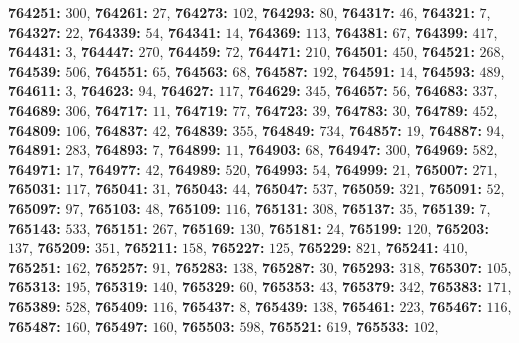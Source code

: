 \textsf{\bfseries 764251:} $300$, \textsf{\bfseries 764261:} $27$, \textsf{\bfseries 764273:} $102$, \textsf{\bfseries 764293:} $80$, \textsf{\bfseries 764317:} $46$, \textsf{\bfseries 764321:} $7$, \textsf{\bfseries 764327:} $22$, \textsf{\bfseries 764339:} $54$, \textsf{\bfseries 764341:} $14$, \textsf{\bfseries 764369:} $113$, \textsf{\bfseries 764381:} $67$, \textsf{\bfseries 764399:} $417$, \textsf{\bfseries 764431:} $3$, \textsf{\bfseries 764447:} $270$, \textsf{\bfseries 764459:} $72$, \textsf{\bfseries 764471:} $210$, \textsf{\bfseries 764501:} $450$, \textsf{\bfseries 764521:} $268$, \textsf{\bfseries 764539:} $506$, \textsf{\bfseries 764551:} $65$, \textsf{\bfseries 764563:} $68$, \textsf{\bfseries 764587:} $192$, \textsf{\bfseries 764591:} $14$, \textsf{\bfseries 764593:} $489$, \textsf{\bfseries 764611:} $3$, \textsf{\bfseries 764623:} $94$, \textsf{\bfseries 764627:} $117$, \textsf{\bfseries 764629:} $345$, \textsf{\bfseries 764657:} $56$, \textsf{\bfseries 764683:} $337$, \textsf{\bfseries 764689:} $306$, \textsf{\bfseries 764717:} $11$, \textsf{\bfseries 764719:} $77$, \textsf{\bfseries 764723:} $39$, \textsf{\bfseries 764783:} $30$, \textsf{\bfseries 764789:} $452$, \textsf{\bfseries 764809:} $106$, \textsf{\bfseries 764837:} $42$, \textsf{\bfseries 764839:} $355$, \textsf{\bfseries 764849:} $734$, \textsf{\bfseries 764857:} $19$, \textsf{\bfseries 764887:} $94$, \textsf{\bfseries 764891:} $283$, \textsf{\bfseries 764893:} $7$, \textsf{\bfseries 764899:} $11$, \textsf{\bfseries 764903:} $68$, \textsf{\bfseries 764947:} $300$, \textsf{\bfseries 764969:} $582$, \textsf{\bfseries 764971:} $17$, \textsf{\bfseries 764977:} $42$, \textsf{\bfseries 764989:} $520$, \textsf{\bfseries 764993:} $54$, \textsf{\bfseries 764999:} $21$, \textsf{\bfseries 765007:} $271$, \textsf{\bfseries 765031:} $117$, \textsf{\bfseries 765041:} $31$, \textsf{\bfseries 765043:} $44$, \textsf{\bfseries 765047:} $537$, \textsf{\bfseries 765059:} $321$, \textsf{\bfseries 765091:} $52$, \textsf{\bfseries 765097:} $97$, \textsf{\bfseries 765103:} $48$, \textsf{\bfseries 765109:} $116$, \textsf{\bfseries 765131:} $308$, \textsf{\bfseries 765137:} $35$, \textsf{\bfseries 765139:} $7$, \textsf{\bfseries 765143:} $533$, \textsf{\bfseries 765151:} $267$, \textsf{\bfseries 765169:} $130$, \textsf{\bfseries 765181:} $24$, \textsf{\bfseries 765199:} $120$, \textsf{\bfseries 765203:} $137$, \textsf{\bfseries 765209:} $351$, \textsf{\bfseries 765211:} $158$, \textsf{\bfseries 765227:} $125$, \textsf{\bfseries 765229:} $821$, \textsf{\bfseries 765241:} $410$, \textsf{\bfseries 765251:} $162$, \textsf{\bfseries 765257:} $91$, \textsf{\bfseries 765283:} $138$, \textsf{\bfseries 765287:} $30$, \textsf{\bfseries 765293:} $318$, \textsf{\bfseries 765307:} $105$, \textsf{\bfseries 765313:} $195$, \textsf{\bfseries 765319:} $140$, \textsf{\bfseries 765329:} $60$, \textsf{\bfseries 765353:} $43$, \textsf{\bfseries 765379:} $342$, \textsf{\bfseries 765383:} $171$, \textsf{\bfseries 765389:} $528$, \textsf{\bfseries 765409:} $116$, \textsf{\bfseries 765437:} $8$, \textsf{\bfseries 765439:} $138$, \textsf{\bfseries 765461:} $223$, \textsf{\bfseries 765467:} $116$, \textsf{\bfseries 765487:} $160$, \textsf{\bfseries 765497:} $160$, \textsf{\bfseries 765503:} $598$, \textsf{\bfseries 765521:} $619$, \textsf{\bfseries 765533:} $102$, 
